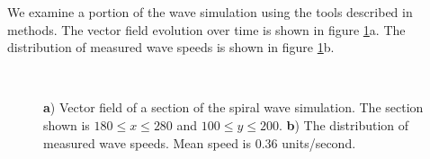 \documentclass[12pt]{article}
\begin{document}
We examine a portion of the wave simulation using the tools described in methods.
The vector field evolution over time is shown in figure \ref{fig:2DSpiralWaveAnalysis}a.
The distribution of measured wave speeds is shown in figure \ref{fig:2DSpiralWaveAnalysis}b.
\begin{figure}[!htb]
 \caption{ \textbf{a}) Vector field of a section of the spiral wave simulation. 
              The section shown is $180\leq x \leq 280$ and $100 \leq y \leq 200$.
           \textbf{b}) The distribution of measured wave speeds. Mean speed is $0.36$ units/second.
           }
 \label{fig:2DSpiralWaveAnalysis}
 \centering
   
   \\
\end{figure}
\FloatBarrier
\end{document}
